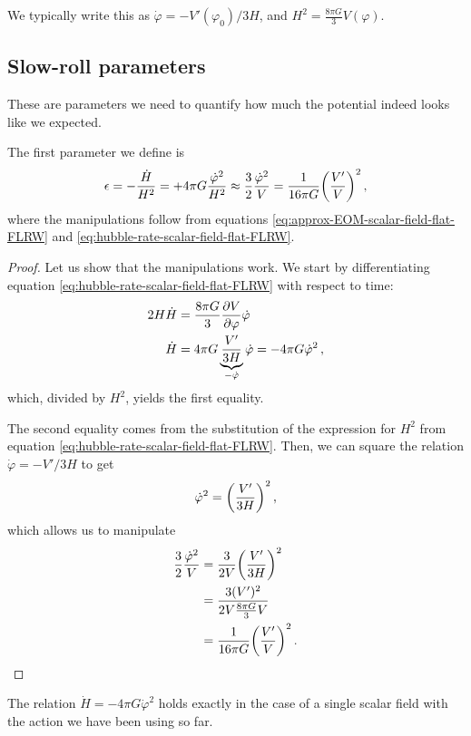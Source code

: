 \documentclass[main.tex]{subfiles}
\begin{document}
We typically write this as \(\dot{\varphi} = - V' (\varphi_0 ) / 3H\), and \(H^2 = \frac{8 \pi G}{3} V(\varphi )\). 

\subsection{Slow-roll parameters}

These are parameters we need to quantify how much the potential indeed looks like we expected. 

The first parameter we define is
%
\begin{align}
\epsilon 
= - \frac{\dot{H}}{H^2} = 
+ 4 \pi G \frac{\dot{\varphi}^2}{H^2} \approx \frac{3}{2} \frac{\dot{\varphi}^2}{V} = \frac{1}{16 \pi G} \qty(\frac{V'}{V})^2
\,,
\end{align}
%
where the manipulations follow from equations \eqref{eq:approx-EOM-scalar-field-flat-FLRW} and \eqref{eq:hubble-rate-scalar-field-flat-FLRW}.

\begin{proof}
Let us show that the manipulations work. We start by differentiating equation \eqref{eq:hubble-rate-scalar-field-flat-FLRW} with respect to time: 
%
\begin{align}
2 H \dot{H} &= \frac{8 \pi G}{3} \pdv{V}{\varphi } \dot{\varphi}  \\
\dot{H} &= 4 \pi G \underbrace{\frac{V'}{3 H}}_{- \dot{\varphi}} \dot{\varphi} = - 4 \pi G \dot{\varphi}^2 \label{eq:hdot-phidot-relation}
\,,
\end{align}
%
which, divided by \(H^2\), yields the first equality. 

The second equality comes from the substitution of the expression for \(H^2\) from equation \eqref{eq:hubble-rate-scalar-field-flat-FLRW}. 
Then, we can square the relation \(\dot{\varphi} = - V' / 3 H\) to get 
%
\begin{align}
\dot{\varphi}^2 = \qty(\frac{V'}{3H})^2
\,,
\end{align}
%
which allows us to manipulate 
%
\begin{align}
\frac{3}{2} \frac{\dot{\varphi}^2}{V} &= \frac{3}{2V} \qty(\frac{V'}{3H})^2  \\
&= \frac{3 (V')^2}{2V \frac{8 \pi G}{3} V}  \\
&= \frac{1}{16 \pi G} \qty( \frac{V'}{V})^2
\,.
\end{align}
\end{proof}

\begin{claim}
The relation \(\dot{H} = - 4 \pi G \dot{\varphi}^2\) holds exactly in the case of a single scalar field with the action we have been using so far. 
\end{claim}
\end{document}
